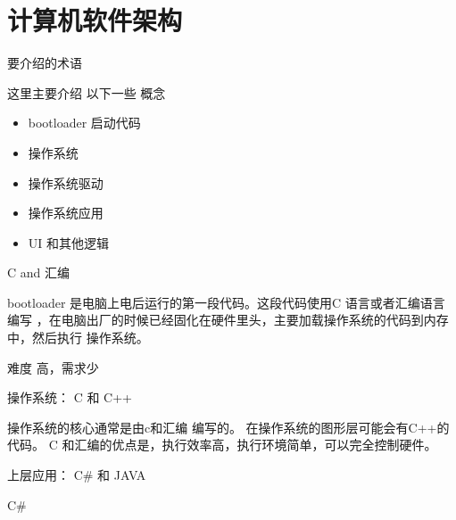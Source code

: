 \documentclass[10pt]{beamer}
\begin{document}
\section{计算机软件架构}

\begin{frame}[fragile]{要介绍的术语}

这里主要介绍 以下一些 概念
\begin{itemize}
\item bootloader 启动代码
\item 操作系统
\item 操作系统驱动
\item 操作系统应用
\item UI 和其他逻辑
\end{itemize}

\end{frame}


\begin{frame}[fragile]{C and 汇编}

bootloader 是电脑上电后运行的第一段代码。这段代码使用C 语言或者汇编语言编写
，在电脑出厂的时候已经固化在硬件里头，主要加载操作系统的代码到内存中，然后执行
操作系统。

难度 高，需求少
\end{frame}



\begin{frame}[fragile]{操作系统： C 和 C++ }

操作系统的核心通常是由c和汇编 编写的。 在操作系统的图形层可能会有C++的代码。
C 和汇编的优点是，执行效率高，执行环境简单，可以完全控制硬件。

\end{frame}


\begin{frame}[fragile]{上层应用： C\# 和 JAVA }

C\#

\end{frame}
\end{document}
